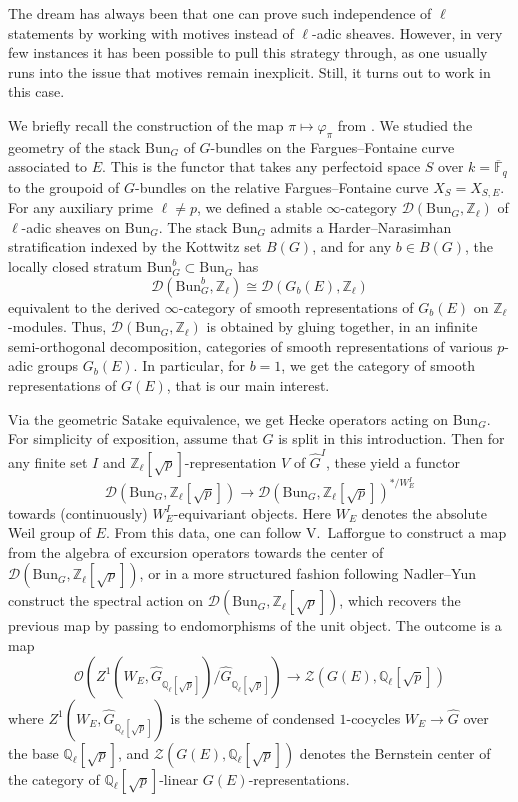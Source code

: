 \documentclass[11pt]{amsart}
\numberwithin{equation}{section}
\numberwithin{theorem}{section}
\theoremstyle{definition}
\begin{document}
The dream has always been that one can prove such independence of $\ell$ statements by working with motives instead of $\ell$-adic sheaves. However, in very few instances it has been possible to pull this strategy through, as one usually runs into the issue that motives remain inexplicit. Still, it turns out to work in this case.

We briefly recall the construction of the map $\pi\mapsto \varphi_\pi$ from \cite{FarguesScholze}. We studied the geometry of the stack $\mathrm{Bun}_G$ of $G$-bundles on the Fargues--Fontaine curve associated to $E$. This is the functor that takes any perfectoid space $S$ over $k=\overline{\mathbb F}_q$ to the groupoid of $G$-bundles on the relative Fargues--Fontaine curve $X_S = X_{S,E}$. For any auxiliary prime $\ell\neq p$, we defined a stable $\infty$-category $\mathcal D(\mathrm{Bun}_G,\mathbb Z_\ell)$ of $\ell$-adic sheaves on $\mathrm{Bun}_G$. The stack $\mathrm{Bun}_G$ admits a Harder--Narasimhan stratification indexed by the Kottwitz set $B(G)$, and for any $b\in B(G)$, the locally closed stratum $\mathrm{Bun}_G^b\subset \mathrm{Bun}_G$ has
\[
\mathcal D(\mathrm{Bun}_G^b,\mathbb Z_\ell)\cong \mathcal D(G_b(E),\mathbb Z_\ell)
\]
equivalent to the derived $\infty$-category of smooth representations of $G_b(E)$ on $\mathbb Z_\ell$-modules. Thus, $\mathcal D(\mathrm{Bun}_G,\mathbb Z_\ell)$ is obtained by gluing together, in an infinite semi-orthogonal decomposition, categories of smooth representations of various $p$-adic groups $G_b(E)$. In particular, for $b=1$, we get the category of smooth representations of $G(E)$, that is our main interest.

Via the geometric Satake equivalence, we get Hecke operators acting on $\mathrm{Bun}_G$. For simplicity of exposition, assume that $G$ is split in this introduction. Then for any finite set $I$ and $\mathbb Z_\ell[\sqrt{p}]$-representation $V$ of $\widehat{G}^I$, these yield a functor
\[
\mathcal D(\mathrm{Bun}_G,\mathbb Z_\ell[\sqrt{p}])\to \mathcal D(\mathrm{Bun}_G,\mathbb Z_\ell[\sqrt{p}])^{\ast/W_E^I}
\]
towards (continuously) $W_E^I$-equivariant objects. Here $W_E$ denotes the absolute Weil group of $E$. From this data, one can follow V.~Lafforgue \cite{VLafforgueExcursion} to construct a map from the algebra of excursion operators towards the center of $\mathcal D(\mathrm{Bun}_G,\mathbb Z_\ell[\sqrt{p}])$, or in a more structured fashion following Nadler--Yun \cite{NadlerYun} construct the spectral action on $\mathcal D(\mathrm{Bun}_G,\mathbb Z_\ell[\sqrt{p}])$, which recovers the previous map by passing to endomorphisms of the unit object. The outcome is a map
\[
\mathcal O(Z^1(W_E,\widehat{G}_{\mathbb Q_\ell[\sqrt{p}]})/\widehat{G}_{\mathbb Q_\ell[\sqrt{p}]})\to \mathcal{Z}(G(E),\mathbb Q_\ell[\sqrt{p}])
\]
where $Z^1(W_E,\widehat{G}_{\mathbb Q_\ell[\sqrt{p}]})$ is the scheme of condensed $1$-cocycles $W_E\to \widehat{G}$ over the base $\mathbb Q_\ell[\sqrt{p}]$, and $\mathcal Z(G(E),\mathbb Q_\ell[\sqrt{p}])$ denotes the Bernstein center of the category of $\mathbb Q_\ell[\sqrt{p}]$-linear $G(E)$-representations.
\end{document}

